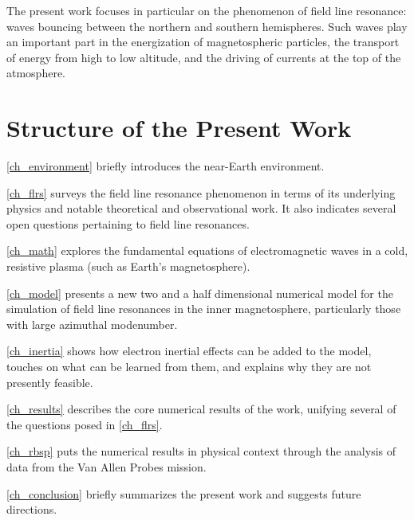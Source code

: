 The present work focuses in particular on the phenomenon of field line resonance: \Alfven waves bouncing between the northern and southern hemispheres. Such waves play an important part in the energization of magnetospheric particles, the transport of energy from high to low altitude, and the driving of currents at the top of the atmosphere. 

\section{Structure of the Present Work}

\cref{ch_environment} briefly introduces the near-Earth environment. 

\cref{ch_flrs} surveys the field line resonance phenomenon in terms of its underlying physics and notable theoretical and observational work. It also indicates several open questions pertaining to field line resonances. 

\cref{ch_math} explores the fundamental equations of electromagnetic waves in a cold, resistive plasma (such as Earth's magnetosphere). 

\cref{ch_model} presents a new two and a half dimensional numerical model for the simulation of field line resonances in the inner magnetosphere, particularly those with large azimuthal modenumber. 

\cref{ch_inertia} shows how electron inertial effects can be added to the model, touches on what can be learned from them, and explains why they are not presently feasible. 

\cref{ch_results} describes the core numerical results of the work, unifying several of the questions posed in \cref{ch_flrs}. 

\cref{ch_rbsp} puts the numerical results in physical context through the analysis of data from the Van Allen Probes mission. 

\cref{ch_conclusion} briefly summarizes the present work and suggests future directions. 


